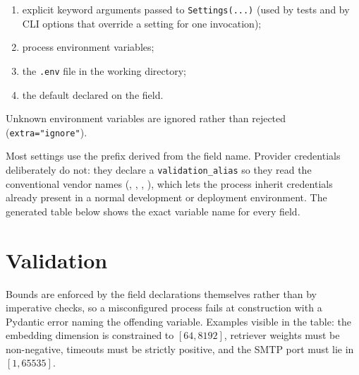 \begin{enumerate}[nosep]
  \item explicit keyword arguments passed to \texttt{Settings(...)} (used by
    tests and by CLI options that override a setting for one invocation);
  \item process environment variables;
  \item the \texttt{.env} file in the working directory;
  \item the default declared on the field.
\end{enumerate}

Unknown environment variables are ignored rather than rejected
(\texttt{extra="ignore"}).

Most settings use the prefix  derived from the field
name. Provider credentials deliberately do not: they declare a
\texttt{validation\_alias} so they read the conventional vendor names
(, ,
, ), which lets the process
inherit credentials already present in a normal development or deployment
environment. The generated table below shows the exact variable name for every
field.

\section{Validation}

Bounds are enforced by the field declarations themselves rather than by
imperative checks, so a misconfigured process fails at construction with a
Pydantic error naming the offending variable. Examples visible in the table:
the embedding dimension is constrained to $[64, 8192]$, retriever weights must
be non-negative, timeouts must be strictly positive, and the SMTP port must lie
in $[1, 65535]$.




